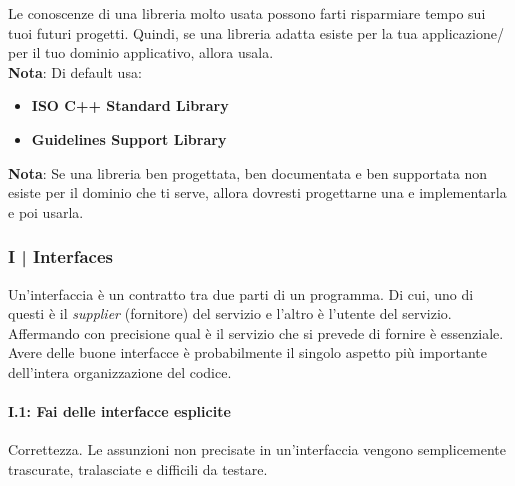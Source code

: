 \textsf{\small Le conoscenze di una libreria molto usata possono farti risparmiare tempo sui tuoi futuri progetti. Quindi, se una libreria adatta esiste per la tua applicazione/ per il tuo dominio applicativo, allora usala.} \\

\textsf{\small \textbf{Nota}: Di default usa: }

\begin{itemize}
	\item \textsf{\small \textbf{ISO C++ Standard Library}} %
	\item \textsf{\small \textbf{Guidelines Support Library}} %
\end{itemize}

\textsf{\small \textbf{Nota}: Se una libreria ben progettata, ben documentata e ben supportata non esiste per il dominio che ti serve, allora dovresti progettarne una e implementarla e poi usarla.} \\


\newpage

\subsubsection{I | Interfaces}

\textsf{\small Un'interfaccia è un contratto tra due parti di un programma. Di cui, uno di questi è il \emph{supplier} (fornitore) del servizio e l'altro è l'utente del servizio. Affermando con precisione qual è il servizio che si prevede di fornire è essenziale.} \\

\textsf{\small Avere delle buone interfacce è probabilmente il singolo aspetto più importante dell'intera organizzazione del codice.} \\

\paragraph{I.1: Fai delle interfacce esplicite}

\textsf{\small Correttezza. Le assunzioni non precisate in un'interfaccia vengono semplicemente trascurate, tralasciate e difficili da testare. } \\

